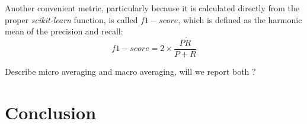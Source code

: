 \documentclass{article}
\begin{document}
Another convenient metric, particularly because it is calculated directly from the proper \textit{scikit-learn} function, is called $f1-score$, which is defined as the harmonic mean of the precision and recall:
\begin{equation}
f1-score = 2 \times \frac{P \dot R }{P + R } 
\end{equation}

{\color{red} Describe micro averaging and macro averaging, will we report both ? }

\section{Conclusion}

\clearpage
{}

\end{document}
